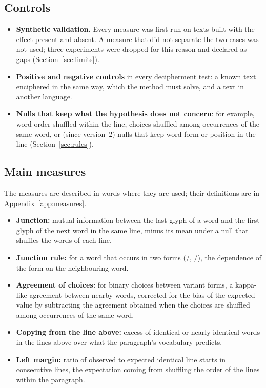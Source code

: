 \subsection{Controls}

\begin{itemize}
\item \textbf{Synthetic validation.} Every measure was first run on texts built with the effect present and absent. A
  measure that did not separate the two cases was not used; three experiments were dropped for this reason and declared
  as gaps (Section~\ref{sec:limits}).
\item \textbf{Positive and negative controls} in every decipherment test: a known text enciphered in the same way, which
  the method must solve, and a text in another language.
\item \textbf{Nulls that keep what the hypothesis does not concern}: for example, word order shuffled within the line,
  choices shuffled among occurrences of the same word, or (since version~2) nulls that keep word form or position in the
  line (Section~\ref{sec:rules}).
\end{itemize}

\subsection{Main measures}

The measures are described in words where they are used; their definitions are in Appendix~\ref{app:measures}.
\begin{itemize}
\item \textbf{Junction:} mutual information between the last glyph of a word and the first glyph of the next word in the
  same line, minus its mean under a null that shuffles the words of each line.
\item \textbf{Junction rule:} for a word that occurs in two forms (/, /), the
  dependence of the form on the neighbouring word.
\item \textbf{Agreement of choices:} for binary choices between variant forms, a kappa-like agreement between nearby
  words, corrected for the bias of the expected value by subtracting the agreement obtained when the choices are
  shuffled among occurrences of the same word.
\item \textbf{Copying from the line above:} excess of identical or nearly identical words in the lines above over what
  the paragraph's vocabulary predicts.
\item \textbf{Left margin:} ratio of observed to expected identical line starts in consecutive lines, the expectation
  coming from shuffling the order of the lines within the paragraph.
\end{itemize}

